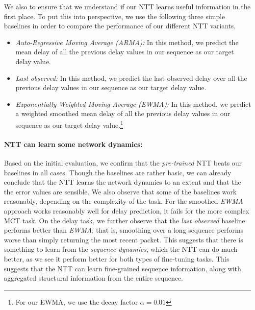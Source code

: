 We also to ensure that we understand if our NTT learns useful information in the first place. To put this into perspective, we use the following three simple baselines in order to compare the performance of our different NTT variants. 
\begin{itemize}
\item \emph{Auto-Regressive Moving Average (ARMA):} In this method, we predict the mean delay of all the previous delay values in our sequence as our target delay value.
\item \emph{Last observed:} In this method, we predict the last observed delay over all the previous delay values in our sequence as our target delay value.
\item \emph{Exponentially Weighted Moving Average (EWMA):}  In this method, we predict a weighted smoothed mean delay of all the previous delay values in our sequence as our target delay value.\footnote{For our EWMA, we use the decay factor $\alpha=0.01$} 
\end{itemize}

\paragraph*{NTT can learn some network dynamics:}

Based on the initial evaluation, we confirm that the \emph{pre-trained} NTT beats our baselines in all cases. Though the baselines are rather basic, we can already conclude that the NTT learns the network dynamics to an extent and that the 
the error values are sensible. We also observe that some of the baselines work reasonably, depending on the complexity of the task. For \eg the smoothed \emph{EWMA} approach works reasonably well for delay prediction, it fails for the more complex MCT task.
On the delay task, we further observe that the \emph{last observed} baseline performs better than \emph{EWMA}; that is, smoothing over a long sequence performs worse than simply returning the most recent packet.
This suggests that there is something to learn from the \emph{sequence dynamics}, which the NTT can do much better, as we see it perform better for both types of fine-tuning tasks. This suggests that the NTT can learn fine-grained sequence information, along with aggregated structural information from the entire sequence.


